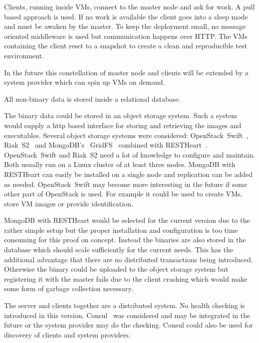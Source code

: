\documentclass[a4paper,twocolumn,twoside]{article}
\begin{document}
Clients, running inside VMs, connect to the master node and ask for work.
A pull based approach is used.
If no work is available the client goes into a sleep mode and must be awaken by the master.
To keep the deployment small, no message oriented middleware is used but communication happens over HTTP.
The VMs containing the client reset to a snapshot to create a clean and reproducible test environment.

In the future this constellation of master node and clients will be extended by a system provider which can spin up VMs on demand.

All non-binary data is stored inside a relational database.

The binary data could be stored in an object storage system.
Such a system would supply a http based interface for storing and retrieving the images and executables.
Several object storage systems were considered: OpenStack~Swift~\cite{OpenStackSwift}, Riak~S2~\cite{RiakS2} and 
MongoDB's~\cite{MongoDB} GridFS~\cite{GridFS} combined with RESTHeart~\cite{RESTHeart}.
OpenStack~Swift and Riak~S2 need a lot of knowledge to configure and maintain.
Both usually run on a Linux cluster of at least three nodes.
MongoDB with RESTHeart can easily be installed on a single node and replication can be added as needed.
OpenStack~Swift may become more interesting in the future if some other part of OpenStack is used.
For example it could be used to create VMs, store VM images or provide identification.

MongoDB with RESTHeart would be selected for the current version due to the rather simple setup but the proper installation and configuration is too time consuming for this proof on concept.
Instead the binaries are also stored in the database which should scale sufficiently for the current needs.
This has the additional advantage that there are no distributed transactions being introduced.
Otherwise the binary could be uploaded to the object storage system but registering it with the master fails due to the client crashing which would make some form of garbage collection necessary.

The server and clients together are a distributed system.
No health checking is introduced in this version.
Consul~\cite{Consul} was considered and may be integrated in the future or the system provider may do the checking.
Consul could also be used for discovery of clients and system providers.

\end{document}
